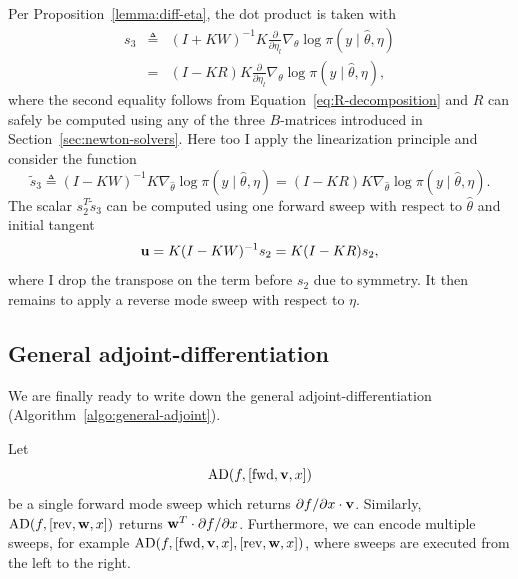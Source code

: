\documentclass[stslayout, noinfoline]{imsart}
\theoremstyle{definition}
\begin{document}
Per Proposition~\ref{lemma:diff-eta}, the dot product is taken with 
\begin{eqnarray}
  s_3 & \triangleq & (I + KW)^{-1} K \frac{\partial}{\partial \eta_l} \nabla_\theta \log \pi(y \mid \hat \theta, \eta) \nonumber \\
  & = & (I - KR) K \frac{\partial}{\partial \eta_l} \nabla_\theta \log \pi(y \mid \hat \theta, \eta),
\end{eqnarray}
%
where the second equality follows from Equation~\ref{eq:R-decomposition}
and $R$ can safely be computed using any of the three $B$-matrices introduced in Section~\ref{sec:newton-solvers}.
Here too I apply the linearization principle and consider the function
\begin{equation}
  \tilde s_3 \triangleq (I - KW)^{-1} K \nabla_{\hat \theta} \log \pi(y \mid \hat \theta, \eta) = (I - KR) K \nabla_{\hat \theta} \log \pi(y \mid \hat \theta, \eta).
\end{equation}
%
The scalar $s^T_2 \tilde s_3$ can be computed using one forward sweep with respect to $\hat \theta$ and initial tangent
\begin{equation} \label{eq:tangent-dot}
  {\bf u} = K (I - KW)^{-1} s_2 = K (I - KR) s_2,
\end{equation}
%
where I drop the transpose on the term before $s_2$ due to symmetry.
It then remains to apply a reverse mode sweep with respect to $\eta$.

\subsection{General adjoint-differentiation} \label{sec:g-adjoint-differentiation}

We are finally ready to write down the general adjoint-differentiation (Algorithm~\ref{algo:general-adjoint}).

Let
\begin{equation*}
  \text{AD}(f, [\text{fwd}, {\bf v}, x])
\end{equation*}
%
be a single forward mode sweep which returns $\partial f / \partial x \cdot {\bf v}$.
Similarly, $\text{AD}(f, [\text{rev}, {\bf w}, x])$ returns ${\bf w}^T \cdot \partial f / \partial x$.
Furthermore, we can encode multiple sweeps, for example $\mathrm{AD}(f, [\text{fwd}, {\bf v}, x], [\text{rev}, {\bf w}, x])$,
where sweeps are executed from the left to the right.
\end{document}
